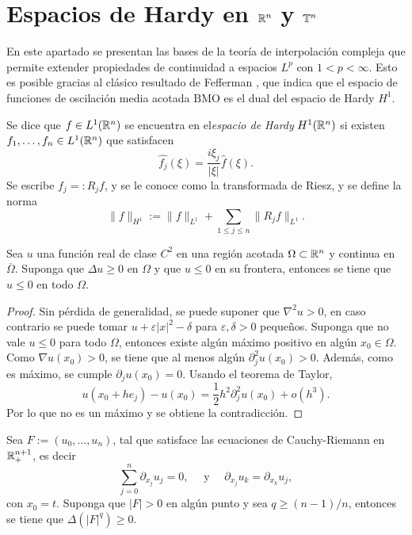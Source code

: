 \section{Espacios de Hardy en $\mathbb{R}^n$ y $\mathbb{T}^n$}
En este apartado se presentan las bases de la teoría de interpolación compleja que permite extender propiedades de continuidad a espacios $L^p$ con $1<p<\infty$. Esto es posible gracias al clásico resultado de Fefferman \cite{fefferman-BMO}, que indica que el espacio de funciones de oscilación media acotada $\mathrm{BMO}$ es el dual del espacio de Hardy $H^1$.
\begin{definition}
	Se dice que $f\in L^1(\mathbb{R}^n)$ se encuentra en el\textit{espacio de Hardy} $H^1(\mathbb{R}^n)$ si existen $f_1,\ldots,f_n\in L^1(\mathbb{R}^n)$ que satisfacen
	\begin{equation*}
		\widehat{f_j} (\xi)= \frac{i\xi_j}{|\xi|}\widehat{f}(\xi).
	\end{equation*}
	Se escribe $f_j=:R_jf$, y se le conoce como la transformada de Riesz, y se define la norma 
	\begin{equation*}
		\|f\|_{H^1} := \|f\|_{L^1} + \sum_{1\leq j\leq n} \|R_jf\|_{L^1}.
	\end{equation*}
\end{definition}
\begin{proposition}
	Sea $u$ una función real de clase $C^2$ en una región acotada $\Omega\subset\mathbb{R}^n$ y continua en $\overline{\Omega}$. Suponga que $\Delta u \geq 0$ en $\Omega$ y que $u\leq0$ en su frontera, entonces se tiene que $u\leq 0$ en todo $\Omega$.
\end{proposition}
\begin{proof}
	Sin pérdida de generalidad, se puede suponer que $\nabla^2 u > 0$, en caso contrario se puede tomar $u+\varepsilon|x|^2 - \delta$ para $\varepsilon,\delta>0$ pequeños. Suponga que no vale $u\leq 0$ para todo $\Omega$, entonces existe algún máximo positivo en algún $x_0\in\Omega$. Como $\nabla u(x_0) >0$, se tiene que al menos algún $\partial^2_j u(x_0) > 0$. Además, como es máximo, se cumple $\partial_j u(x_0) = 0$. Usando el teorema de Taylor,
	\begin{equation*}
		u(x_0+he_j) - u(x_0) = \frac{1}{2} h^2\partial^2_j u(x_0) + o(h^3).
	\end{equation*}
	Por lo que no es un máximo y se obtiene la contradicción.
\end{proof}
\begin{lemma}
	Sea $F:=(u_0,\ldots,u_n)$, tal que satisface las ecuaciones de Cauchy-Riemann en $\mathbb{R}^{n+1}_+$, es decir 
	\begin{equation*}
		\sum_{j=0}^n \partial_{x_j}u_j = 0, \quad \text{ y } \quad \partial_{x_j}u_k = \partial_{x_k}u_j,
	\end{equation*}
	con $x_0=t$.  Suponga que $|F|>0$ en algún punto y sea $q\geq(n-1)/n$, entonces se tiene que $\Delta(|F|^q) \geq 0$.
\end{lemma}
